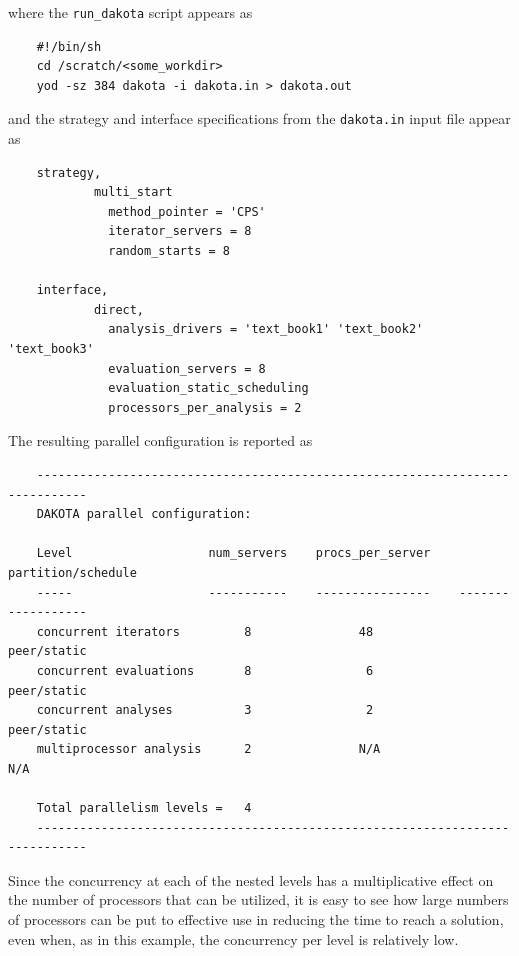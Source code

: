where the \texttt{run\_dakota} script appears as
\begin{small}
\begin{verbatim}
    #!/bin/sh
    cd /scratch/<some_workdir>
    yod -sz 384 dakota -i dakota.in > dakota.out
\end{verbatim}
\end{small}

and the strategy and interface specifications from the
\texttt{dakota.in} input file appear as
\begin{small}
\begin{verbatim}
    strategy,
            multi_start
              method_pointer = 'CPS'
              iterator_servers = 8
              random_starts = 8

    interface,
            direct,
              analysis_drivers = 'text_book1' 'text_book2' 'text_book3'
              evaluation_servers = 8
              evaluation_static_scheduling
              processors_per_analysis = 2
\end{verbatim}
\end{small}

The resulting parallel configuration is reported as
\begin{small}
\begin{verbatim}
    -----------------------------------------------------------------------------
    DAKOTA parallel configuration:

    Level                   num_servers    procs_per_server    partition/schedule
    -----                   -----------    ----------------    ------------------
    concurrent iterators         8               48              peer/static
    concurrent evaluations       8                6              peer/static
    concurrent analyses          3                2              peer/static
    multiprocessor analysis      2               N/A                N/A

    Total parallelism levels =   4
    -----------------------------------------------------------------------------
\end{verbatim}
\end{small}

Since the concurrency at each of the nested levels has a
multiplicative effect on the number of processors that can be
utilized, it is easy to see how large numbers of processors can be put
to effective use in reducing the time to reach a solution, even when,
as in this example, the concurrency per level is relatively low.



